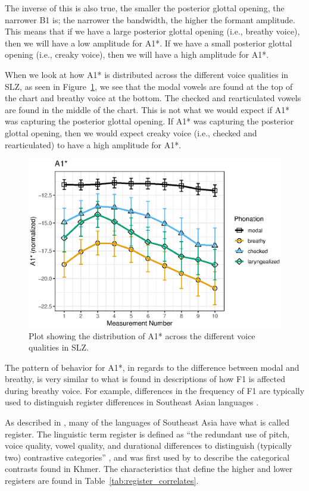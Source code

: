 The inverse of this is also true, the smaller the posterior glottal opening, the narrower B1 is; the narrower the bandwidth, the higher the formant amplitude. This means that if we have a large posterior glottal opening (i.e., breathy voice), then we will have a low amplitude for A1*. If we have a small posterior glottal opening (i.e., creaky voice), then we will have a high amplitude for A1*.

When we look at how A1* is distributed across the different voice qualities in SLZ, as seen in Figure~\ref{fig:a1}, we see that the modal vowels are found at the top of the chart and breathy voice at the bottom. The checked and rearticulated vowels are found in the middle of the chart. This is not what we would expect if A1* was capturing the posterior glottal opening. If A1* was capturing the posterior glottal opening, then we would expect creaky voice (i.e., checked and rearticulated) to have a high amplitude for A1*.
\begin{figure}[h!]
    \centering
    \includegraphics[width = 0.9\linewidth]{images/slz_a1c.eps}
    \caption{Plot showing the distribution of A1* across the different voice qualities in SLZ.}
    \label{fig:a1}
\end{figure}

The pattern of behavior for A1*, in regards to the difference between modal and breathy, is very similar to what is found in descriptions of how F1 is affected during breathy voice. For example, differences in the frequency of F1 are typically used to distinguish register differences in Southeast Asian languages \citep{brunelleRegisterEasternCham2005,brunelleDialectExperiencePerceptual2012,brunelleTonePhonationSoutheast2016}.

As described in \citet{brunelleTonePhonationSoutheast2016}, many of the languages of Southeast Asia have what is called register. The linguistic term register is defined as ``the redundant use of pitch, voice quality, vowel quality, and durational differences to distinguish (typically two) contrastive categories'' \citep[193]{brunelleTonePhonationSoutheast2016}, and was first used by \citet{hendersonMainFeaturesCambodian1952} to describe the categorical contrasts found in Khmer. The characteristics that define the higher and lower registers are found in Table~\ref{tab:register_correlates}.

